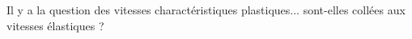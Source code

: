 Il y a la question des vitesses charactéristiques plastiques... sont-elles collées aux vitesses élastiques ?



